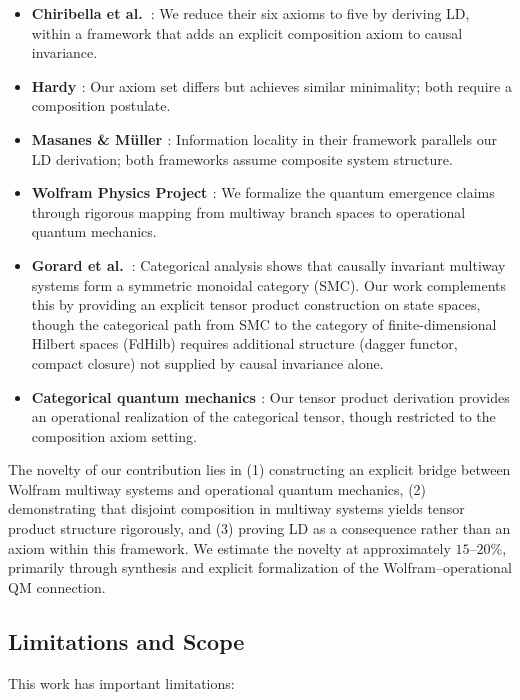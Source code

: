 \documentclass[11pt,a4paper]{article}
\theoremstyle{definition}
\theoremstyle{remark}
\begin{document}
\begin{itemize}
\item \textbf{Chiribella et al.\ \cite{chiribella2011informational}}: We
  reduce their six axioms to five by deriving LD, within a framework
  that adds an explicit composition axiom to causal invariance.
\item \textbf{Hardy \cite{hardy2001quantum}}: Our axiom set differs but
  achieves similar minimality; both require a composition postulate.
\item \textbf{Masanes \& M\"uller \cite{masanes2011general}}:
  Information locality in their framework parallels our LD derivation;
  both frameworks assume composite system structure.
\item \textbf{Wolfram Physics Project \cite{wolfram2020new}}: We
  formalize the quantum emergence claims through rigorous mapping from
  multiway branch spaces to operational quantum mechanics.
\item \textbf{Gorard et al.\ \cite{gorard2021categorical}}: Categorical
  analysis shows that causally invariant multiway systems form a
  symmetric monoidal category (SMC). Our work complements this by
  providing an explicit tensor product construction on state spaces,
  though the categorical path from SMC to the category of finite-dimensional
  Hilbert spaces (FdHilb) requires additional structure (dagger functor,
  compact closure) not supplied by causal invariance alone.
\item \textbf{Categorical quantum mechanics \cite{coecke2010quantum}}:
  Our tensor product derivation provides an operational realization of
  the categorical tensor, though restricted to the composition axiom
  setting.
\end{itemize}

The novelty of our contribution lies in (1) constructing an explicit
bridge between Wolfram multiway systems and operational quantum mechanics,
(2) demonstrating that disjoint composition in multiway systems yields
tensor product structure rigorously, and (3) proving LD as a consequence
rather than an axiom within this framework. We estimate the novelty at
approximately $15$--$20\%$, primarily through synthesis and explicit
formalization of the Wolfram--operational QM connection.

\subsection{Limitations and Scope}

This work has important limitations:
\end{document}
